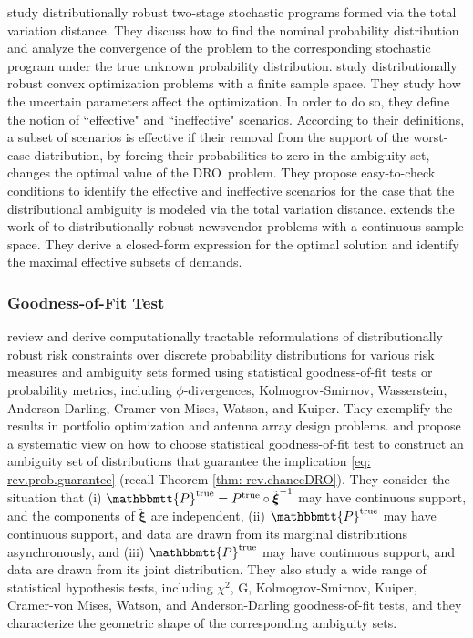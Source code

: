 \documentclass[final,onefignum,onetabnum]{class}
\newcommand{\bs}[1]{\boldsymbol{#1}} %
\newcommand{\Ts}[1]{\mathbbmtt{#1}} %
\newcommand{\txi}{\tilde{\bs{\xi}}}
\newcommand{\trueP}{\Ts{P}^{\text{true}}}
\newcommand{\dro}{DRO}
\begin{document}
\citet{jiang2018} study distributionally robust two-stage stochastic programs  \linebreak formed via the  total variation distance. They discuss how to find the nominal probability distribution and analyze the convergence of the problem to the corresponding stochastic program under the true unknown probability distribution.   
\citet{rahimian2019} study distributionally robust convex optimization problems with a finite sample space. They study how the uncertain parameters affect the optimization. In order to  do so, they define the notion of ``effective" and ``ineffective" scenarios. According to their definitions, a subset of scenarios is effective if their removal from the support of the worst-case distribution, by forcing their probabilities to zero in the ambiguity set, changes the optimal value of the \dro\ problem. They propose easy-to-check conditions to identify the effective and ineffective scenarios for the case that the distributional ambiguity is modeled via the total variation distance. 
\citet{rahimian2019NV} extends the work of \citet{rahimian2019} to distributionally robust newsvendor problems with a continuous sample space. They derive a closed-form expression for the optimal solution and identify the maximal effective subsets of demands. %



\subsubsection{Goodness-of-Fit Test}

\citet{postek2016} review and derive computationally tractable reformulations of distributionally robust risk constraints over discrete probability
distributions for various risk measures and ambiguity sets formed using statistical
goodness-of-fit tests or probability metrics, including $\phi$-divergences, Kolmogrov-Smirnov, Wasserstein, Anderson-Darling, Cramer-von Mises, Watson, and Kuiper.  They exemplify the results in portfolio optimization and antenna
array design problems. 
\citet{bertsimas2018RO} and \citet{bertsimas2018SAA} propose a systematic view on how to choose statistical goodness-of-fit test to construct an ambiguity set of distributions that guarantee the implication \eqref{eq: rev.prob.guarantee} (recall Theorem \ref{thm: rev.chanceDRO}). They consider the situation that (i) $\trueP=P^{\text{true}} \circ \txi^{-1}$ may have continuous support, and the components of $\txi$ are independent, (ii)  $\trueP$ may have continuous support, and data are drawn from its marginal distributions
asynchronously, and (iii) $\trueP$ may have continuous support, and data are drawn from its joint distribution. They also study a wide range of statistical hypothesis tests, including $\chi^{2}$, G, Kolmogrov-Smirnov, Kuiper, Cramer-von Mises, Watson, and Anderson-Darling goodness-of-fit tests, and they characterize the geometric shape of the corresponding ambiguity sets.  
\end{document}
